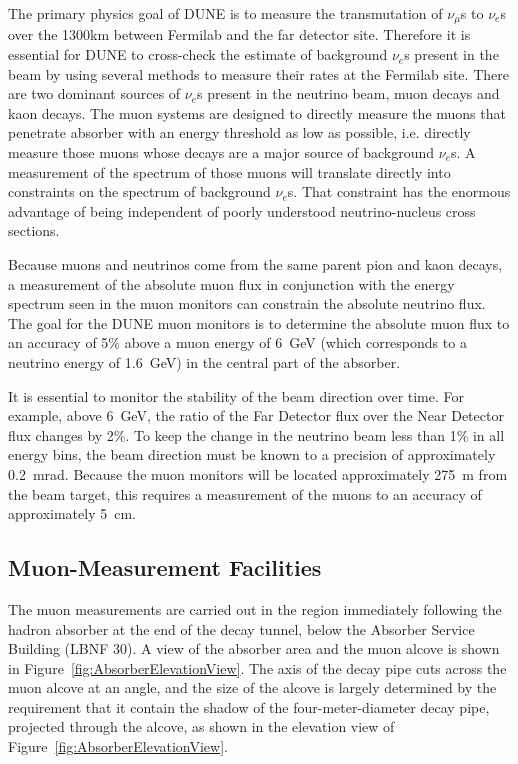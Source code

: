 The primary physics goal of DUNE is to measure the transmutation
of $\nu_\mu$s to $\nu_e$s over the 1300km between Fermilab
and the far detector site.
Therefore it is essential for DUNE to cross-check the estimate of 
background $\nu_e$s present in the beam by using several
methods to measure their rates at the Fermilab site. 
There are two dominant sources of $\nu_e$s present in the
neutrino beam, muon decays and kaon decays. 
The muon systems are designed to directly measure the 
muons that penetrate absorber with an energy 
threshold as low as possible, i.e. directly measure those muons 
whose decays are a major source of background $\nu_e$s. 
A measurement of the spectrum of those muons will translate
 directly into constraints on the spectrum of background $\nu_e$s.
That constraint has the enormous advantage of being independent of poorly understood 
neutrino-nucleus cross sections.

Because muons and neutrinos come from the same parent pion and kaon
decays, a measurement of the absolute muon flux in conjunction with the energy spectrum
seen in the muon monitors can constrain the absolute neutrino flux.  
The goal for the DUNE muon monitors is to determine the absolute muon flux
to an accuracy of 5\% above a muon energy of 6~GeV (which corresponds to
a neutrino energy of 1.6~GeV) in the central part of the absorber.

It is essential to monitor the stability of the beam direction over
time. For example, above 6~GeV, the ratio of the Far Detector flux over 
the Near Detector flux changes by 2\%.  
To keep the change in the neutrino beam less than 1\% in all energy bins,
the beam direction must be known to a precision of approximately 0.2~mrad. 
Because the muon monitors will be located approximately 275~m
from the beam target, this requires a measurement of the muons to an
accuracy of approximately 5~cm.

%
%
\subsection{Muon-Measurement Facilities}
\label{subsec:detectors-nd-blm-muon-measurement-facilities}

The muon measurements are carried out in the region immediately
following the hadron absorber at the end of the decay tunnel, below
the Absorber Service Building (LBNF 30).  A view
of the absorber area and the muon alcove is shown in Figure~\ref{fig:AbsorberElevationView}. 
The axis of the decay pipe cuts across the muon alcove at an angle, and the size of the alcove
is largely determined by the requirement that it contain the
shadow of the four-meter-diameter decay pipe, projected through the
alcove, as shown in the elevation view of Figure~\ref{fig:AbsorberElevationView}. 

